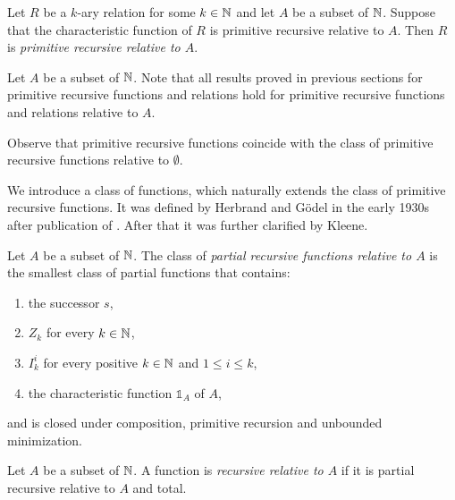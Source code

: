 \documentclass[10pt]{amsart}
\begin{document}
\begin{definition}
	Let $R$ be a $k$-ary relation for some $k \in {\mathbb N}$ and let $A$ be a subset of ${\mathbb N}$. Suppose that the characteristic function of $R$ is primitive recursive relative to $A$. Then $R$ is \textit{primitive recursive relative to $A$}.
\end{definition}

\begin{remark}\label{remark:primitive_recursive_relative_to_subset_have_all_nice_properties}
	Let $A$ be a subset of ${\mathbb N}$. Note that all results proved in previous sections for primitive recursive functions and relations hold for primitive recursive functions and relations relative to $A$.
\end{remark}

\begin{remark}\label{remark:primitive_recursive_are_primitive_recursive_relative_to_empty_set}
	Observe that primitive recursive functions coincide with the class of primitive recursive functions relative to $\emptyset$.
\end{remark}
\noindent
We introduce a class of functions, which naturally extends the class of primitive recursive functions. It was defined by Herbrand and G{\"o}del in the early 1930s after publication of \cite{godel1931formal}. After that it was further clarified by Kleene.

\begin{definition}
	Let $A$ be a subset of ${\mathbb N}$. The class of \textit{partial recursive functions relative to $A$} is the smallest class of partial functions that contains:
	\begin{enumerate}[label=\textbf{(\arabic*)}, leftmargin=3.0em]
		\item the successor $s$,
		\item $Z_k$ for every $k \in {\mathbb N}$,
		\item $I^i_k$ for every positive $k \in {\mathbb N}$ and $1\leq i \leq k$,
		\item the characteristic function $\mathbb{1}_A$ of $A$,
	\end{enumerate}
	and is closed under composition, primitive recursion and unbounded minimization.
\end{definition}

\begin{definition}
	Let $A$ be a subset of ${\mathbb N}$. A function is \textit{recursive relative to $A$} if it is partial recursive relative to $A$ and total.
\end{definition}
\end{document}
